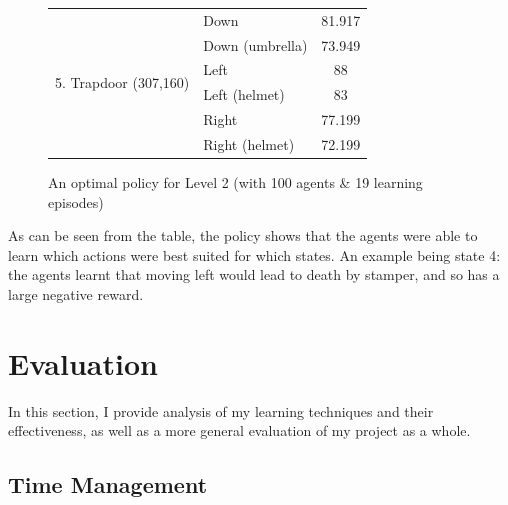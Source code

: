\documentclass[a4paper,oneside]{report}
\begin{document}
\begin{figure}[h!]
\begin{tabular}{|l|l|c|}
\multirow{6}{*}{5. Trapdoor (307,160)} & Down & 81.917 \\
 & Down (umbrella) & 73.949 \\
 & Left & 88 \\
 & Left (helmet) & 83 \\
 & Right & 77.199 \\
 & Right (helmet) & 72.199 \\ \hline
 
\end{tabular}

\caption{An optimal policy for Level 2 (with 100 agents \& 19 learning episodes)}
\end{figure}

As can be seen from the table, the policy shows that the agents were able to learn which actions were best suited for which states. An example being state 4: the agents learnt that moving left would lead to death by stamper, and so has a large negative reward.



%
%

\chapter{Evaluation}

In this section, I provide analysis of my learning techniques and their effectiveness, as well as a more general evaluation of my project as a whole.

\section{Time Management}
\end{document}
